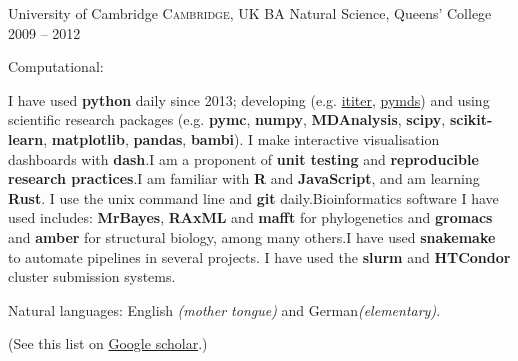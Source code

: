 \documentclass[10pt,a4paper]{article}
\begin{document}
\headedsection
{University of Cambridge}
{\textsc{Cambridge, UK}} {%
  \headedsubsection
  {BA Natural Science, Queens' College}
  {2009 -- 2012}
  {
  }
}

\spacedhrule{0.9em}{-0.4em}


\inlineheadsection  %
{Computational:} {
  
  I have used \textbf{python} daily since 2013; developing (e.g.\@
  \href{https://ititer.readthedocs.io/}{ititer},
  \href{https://pymds.readthedocs.io}{pymds}) and using scientific research packages
  (e.g. \textbf{pymc}, \textbf{numpy}, \textbf{MDAnalysis}, \textbf{scipy},
  \textbf{scikit-learn}, \textbf{matplotlib}, \textbf{pandas}, \textbf{bambi}). I make
  interactive visualisation dashboards with \textbf{dash}.\sbull I am a proponent of
  \textbf{unit testing} and \textbf{reproducible research practices}.\sbull I am familiar
  with \textbf{R} and \textbf{JavaScript}, and am learning \textbf{Rust}. \sbull I use
  the unix command line and \textbf{git} daily.\sbull Bioinformatics software I have used
  includes: \textbf{MrBayes}, \textbf{RAxML} and \textbf{mafft} for phylogenetics and
  \textbf{gromacs} and \textbf{amber} for structural biology, among many others.\sbull I
  have used \textbf{snakemake} to automate pipelines in several projects.\sbull
  I have used the \textbf{slurm} and \textbf{HTCondor} cluster submission systems.}

\vspace{0.5em}
\inlineheadsection
{Natural languages:}
{English \emph{(mother tongue)} and German\emph{(elementary)}.}



\spacedhrule{1.6em}{-0.4em}

(See this list on
\href{https://scholar.google.co.uk/citations?user=q260RVcAAAAJ&hl=en}{Google scholar}.)

\nocite{*}
\printbibliography


\spacedhrule{1.6em}{-0.4em}


\end{document}

